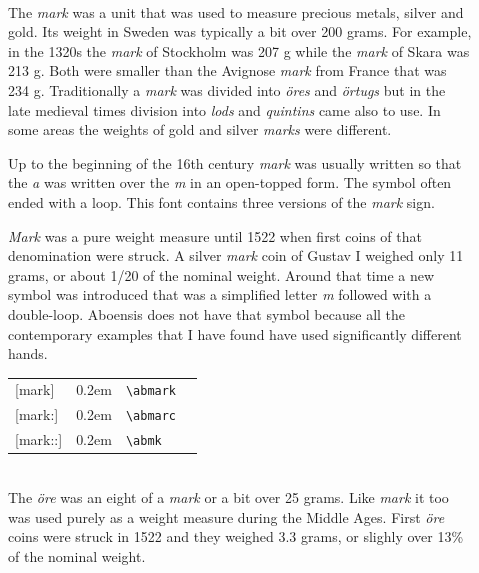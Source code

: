 \documentclass[a4paper]{article}
\newcommand{\samplefont}{\fontsize{16}{16}\abcursivefamily\spaceskip0.2em}
\newcommand{\sample}[1]{{\samplefont #1 \strut}}
\newcommand{\ltxncmd}[1]{\texttt{\textbackslash{}#1}}
\begin{document}
\begin{description}
\item[\sample{\abmark} \sample{\abmarc} \sample{\abmk} \emph{Mark}, \emph{markka}] \mbox{}\\
  The \emph{mark} was a unit that was used to measure precious metals,
  silver and gold. Its weight in Sweden was typically a bit over 200
  grams. For example, in the 1320s the \emph{mark} of Stockholm was
  207 g while the \emph{mark} of Skara was 213 g. Both were smaller
  than the Avignose \emph{mark} from France that was 234 g.
  Traditionally a \emph{mark} was divided into \emph{öres} and
  \emph{örtugs} but in the late medieval times division into
  \emph{lods} and \emph{quintins} came also to use. In some areas the
  weights of gold and silver \emph{marks} were different.

  Up to the beginning of the 16th century \emph{mark} was usually
  written so that the \emph{a} was written over the \emph{m} in an
  open-topped form. The symbol often ended with a loop. This font
  contains three versions of the \emph{mark} sign.

  \emph{Mark} was a pure weight measure until 1522 when first coins of
  that denomination were struck. A silver \emph{mark} coin of Gustav I
  weighed only 11 grams, or about 1/20 of the nominal weight. Around
  that time a new symbol was introduced that was a simplified letter
  \emph{m} followed with a double-loop. Aboensis does not have that
  symbol because all the contemporary examples that I have found have
  used significantly different hands.
  
  \begin{center}
    \begin{tabular}{llll}
      {}[mark]  & \sample{\abmark} & \ltxncmd{abmark} \\
      {}[mark:] & \sample{\abmarc} & \ltxncmd{abmarc}    \\
      {}[mark::] & \sample{\abmk} & \ltxncmd{abmk}  \\
    \end{tabular}
  \end{center}

\item[\sample{\abore} \emph{Öre}, \emph{äyri}] \mbox{}\\
  The \emph{öre} was an eight of a \emph{mark} or a bit over 25 grams.
  Like \emph{mark} it too was used purely as a weight measure during
  the Middle Ages. First \emph{öre} coins were struck in 1522 and they
  weighed 3.3 grams, or slighly over 13\% of the nominal weight.


\end{description}
\end{document}
